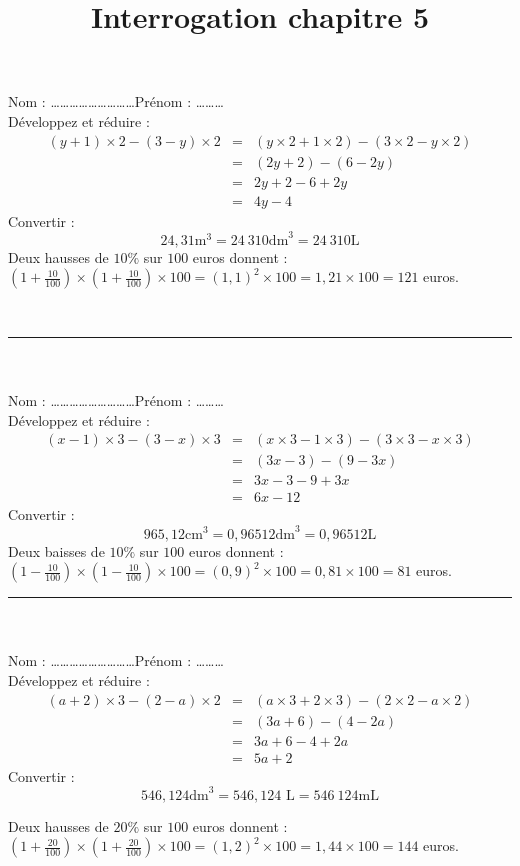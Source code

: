 \documentclass[14 pt, fleqn]{extarticle}
\title{Interrogation chapitre 5}
\date{}
\theoremstyle{plain}
\begin{document}
 Nom : \ldots\ldots\ldots\ldots\ldots\ldots\ldots\ldots\ldots Prénom : \ldots\ldots\ldots \\ 
Développez et réduire :
 \begin{eqnarray*} (y+1)\times 2 - (3 - y) \times 2 
 &=& (y\times 2 + 1\times 2) - ( 3\times 2 - y \times 2) \\
 &=& (2 y + 2) - (6 - 2y) \\
 &=& 2y + 2 - 6 + 2y \\
 &=& 4y - 4\end{eqnarray*}
 Convertir : 
 \[ 24,31 \text{m}^3 = 24\ 310\text{dm}^3 =   24\ 310 \text{L}\]
Deux hausses de $10 \%$ sur $100$ euros donnent :$(1+\frac{10}{100})\times (1+\frac{10}{100}) \times 100 = (1,1)^2\times 100 =1,21\times 100= 121$ euros.
 
 \ \\  
 \hrule
 \ \\ \ \\
 Nom : \ldots\ldots\ldots\ldots\ldots\ldots\ldots\ldots\ldots Prénom : \ldots\ldots\ldots \\ 
Développez et réduire :
\begin{eqnarray*}
(x-1)\times 3 - (3 - x) \times 3
&=& ( x \times 3 - 1 \times 3) - ( 3\times 3 - x \times 3)\\
&=& (3x - 3) - (9 -3x) \\
&=& 3x - 3 - 9 + 3x \\
&=& 6x -12 \end{eqnarray*} 
 Convertir : 
 \[ 965,12\text{cm}^3 = 0,965 12\text{dm}^3 = 0,965 12 \text{L}\]
Deux baisses de $10 \%$ sur $100$ euros donnent : 
$(1-\frac{10}{100}) \times (1-\frac{10}{100}) \times 100 = (0,9)^2 \times 100 = 0,81 \times 100 = 81$ euros.
 
 \newpage
 \hrule
 \ \\ \ \\
 Nom : \ldots\ldots\ldots\ldots\ldots\ldots\ldots\ldots\ldots Prénom : \ldots\ldots\ldots \\ 
Développez et réduire :
 \begin{eqnarray*}
(a+2)\times 3 - (2 - a) \times 2
&=& ( a \times 3 +2 \times 3) - (2\times 2 - a \times 2)\\
&=& (3a +6) - (4-2a) \\
&=& 3a + 6 - 4 + 2a \\
&=& 5a +2 \end{eqnarray*} 
 Convertir : 
 \[ 546,124 \text{dm}^3 = 546,124\text{ L} =  546\ 124 \text{mL}\]
 
Deux hausses de $20 \%$ sur $100$ euros donnent :$(1+\frac{20}{100})\times (1+\frac{20}{100}) \times 100 = (1,2)^2\times 100 =1,44\times 100= 144$ euros.
 
\end{document}
